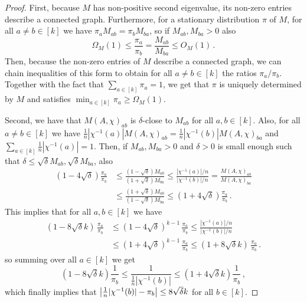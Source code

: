 \begin{proof}
First, because $M$ has non-positive second eigenvalue, its non-zero entries describe a connected graph.
Furthermore, for a stationary distribution $\pi$ of $M$, for all $a \neq b \in [k]$ we have $\pi_a M_{ab} = \pi_b M_{ba}$, so if $M_{ab},M_{ba}>0$ also 
\[\Omega_M(1) \leq \frac{\pi_a}{\pi_b} = \frac{M_{ab}}{M_{ba}} \leq O_M(1)\,.\]
Then, because the non-zero entries of $M$ describe a connected graph, we can chain inequalities of this form to obtain for all $a \neq b \in [k]$ the ratios $\pi_a/\pi_b$.
Together with the fact that $\sum_{a \in [k]} \pi_a = 1$, we get that $\pi$ is uniquely determined by $M$ and satisfies $\min_{a \in [k]} \pi_a \geq \Omega_M(1)$.

Second, we have that $M(A, \chi)_{ab}$ is $\delta$-close to $M_{ab}$ for all $a,b\in [k]$. 
Also, for all $a \neq b \in [k]$ we have $\frac{1}{n}|\chi^{-1}(a)| M(A, \chi)_{ab} = \frac{1}{n}|\chi^{-1}(b)| M(A, \chi)_{ba}$ and $\sum_{a \in [k]} \frac{1}{n}|\chi^{-1}(a)| = 1$.
Then, if $M_{ab},M_{ba}>0$ and $\delta > 0$ is small enough such that $\delta \leq \sqrt{\delta} M_{ab}, \sqrt{\delta} M_{ba}$, also 
\begin{align*}
    (1-4\sqrt{\delta}) \frac{\pi_a}{\pi_b}
    &\le \frac{(1-\sqrt{\delta})M_{ab}}{(1+\sqrt{\delta})M_{ba}}
      \le \frac{|\chi^{-1}(a)|/n}{|\chi^{-1}(b)|/n}
      = \frac{M(A,\chi)_{ab}}{M(A,\chi)_{ba}} \\[6pt]
    &\le \frac{(1+\sqrt{\delta})M_{ab}}{(1-\sqrt{\delta})M_{ba}}
      \le (1+4\sqrt{\delta})\frac{\pi_a}{\pi_b}\,.
\end{align*}  
This implies that for all $a, b \in[k]$ we have 
\begin{align*}
    (1-8\sqrt{\delta}k)\,\frac{\pi_a}{\pi_b}
    &\le (1-4\sqrt{\delta})^{k-1}\,\frac{\pi_a}{\pi_b}
      \le \frac{|\chi^{-1}(a)|/n}{|\chi^{-1}(b)|/n} \\[6pt]
    &\le (1+4\sqrt{\delta})^{k-1}\,\frac{\pi_a}{\pi_b}
      \le (1+8\sqrt{\delta}k)\,\frac{\pi_a}{\pi_b}\,.
\end{align*}  
so summing over all $a \in [k]$ we get 
\[(1-8\sqrt{\delta}k)\frac{1}{\pi_b} \leq \frac{1}{\frac{1}{n}|\chi^{-1}(b)|} \leq (1+4\sqrt{\delta}k) \frac{1}{\pi_b}\,,\]
which finally implies that $\left\lvert\frac{1}{n}|\chi^{-1}(b)| - \pi_b\right\rvert \leq 8\sqrt{\delta}k$ for all $b \in [k]$.
\end{proof}

